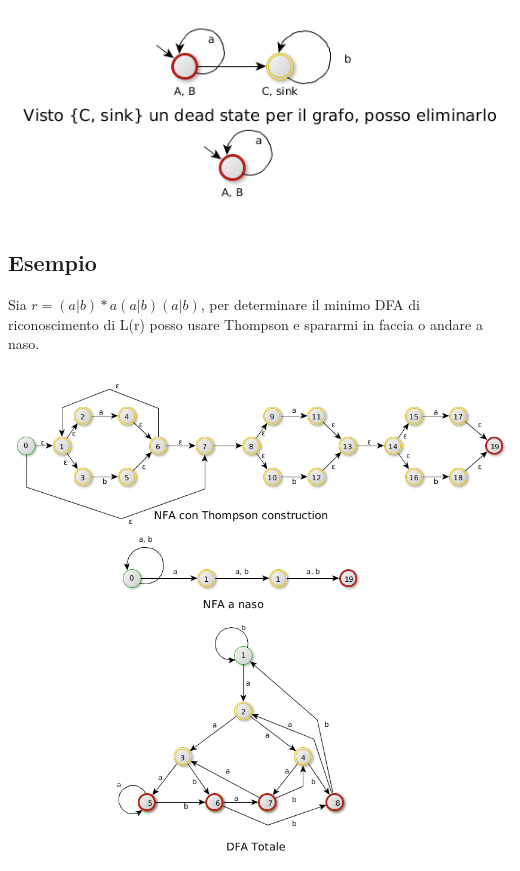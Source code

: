 \begin{center}
	\includegraphics[scale=0.5]{Chapters/Img/c02_08.png}\\
\end{center} 

\subsection{Esempio}
Sia $r=(a|b)*a(a|b)(a|b)$, per determinare il minimo DFA di riconoscimento di L(r) posso usare Thompson e spararmi in faccia o andare
a naso.

\begin{center}
	\includegraphics[scale=0.5]{Chapters/Img/c02_09.png}\\
\end{center} 

